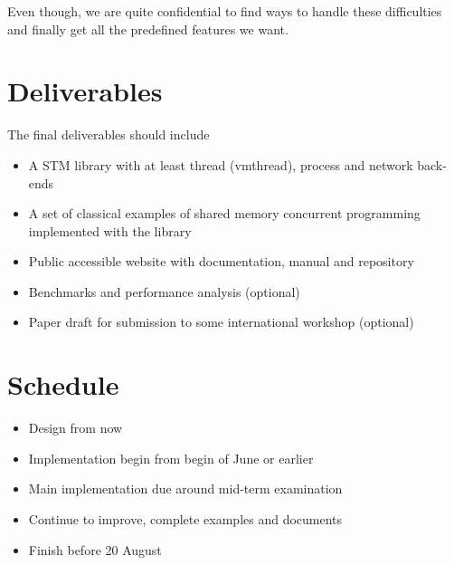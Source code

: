 \documentclass{article}
\begin{document}
Even though, we are quite confidential to find ways to handle these
difficulties and finally get all the predefined features we want.



\section{Deliverables}

The final deliverables should include

\begin{itemize}

  \item A STM library with at least thread (vmthread), process and network back-ends
  \item A set of classical examples of shared memory concurrent programming
    implemented with the library
  \item Public accessible website with documentation, manual and repository
  \item Benchmarks and performance analysis (optional)
  \item Paper draft for submission to some international workshop (optional)

\end{itemize}

\section{Schedule}

\begin{itemize}

  \item Design from now
  \item Implementation begin from begin of June or earlier
  \item Main implementation due around mid-term examination
  \item Continue to improve, complete examples and documents
  \item Finish before 20 August

\end{itemize}



\end{document}
